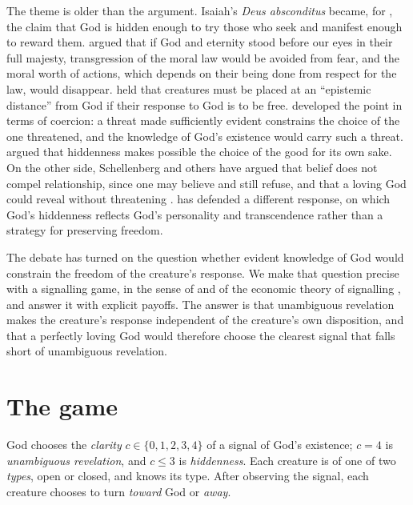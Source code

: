 \documentclass{situationist-preprint}
\begin{document}
The theme is older than the argument. Isaiah's \emph{Deus absconditus} became, for \citet{Pascal1670}, the claim that God is hidden enough to try those who seek and manifest enough to reward them. \citet[Part~I, Book~II, Ch.~2, \S~IX]{Kant1788} argued that if God and eternity stood before our eyes in their full majesty, transgression of the moral law would be avoided from fear, and the moral worth of actions, which depends on their being done from respect for the law, would disappear. \citet{Hick1966} held that creatures must be placed at an \enquote{epistemic distance} from God if their response to God is to be free. \citet{Murray1993} developed the point in terms of coercion: a threat made sufficiently evident constrains the choice of the one threatened, and the knowledge of God's existence would carry such a threat. \citet{Swinburne1998} argued that hiddenness makes possible the choice of the good for its own sake. On the other side, Schellenberg and others have argued that belief does not compel relationship, since one may believe and still refuse, and that a loving God could reveal without threatening \citep{Schellenberg2015}. \citet{Rea2018} has defended a different response, on which God's hiddenness reflects God's personality and transcendence rather than a strategy for preserving freedom.

The debate has turned on the question whether evident knowledge of God would constrain the freedom of the creature's response. We make that question precise with a signalling game, in the sense of \citet{Lewis1969} and of the economic theory of signalling \citep{Spence1973,CrawfordSobel1982,Skyrms2010}, and answer it with explicit payoffs. The answer is that unambiguous revelation makes the creature's response independent of the creature's own disposition, and that a perfectly loving God would therefore choose the clearest signal that falls short of unambiguous revelation.

\section{The game}

\begin{definition}\label{d:game}
God chooses the \emph{clarity} $c \in \{0, 1, 2, 3, 4\}$ of a signal of God's existence; $c = 4$ is \emph{unambiguous revelation}, and $c \leq 3$ is \emph{hiddenness}. Each creature is of one of two \emph{types}, open or closed, and knows its type. After observing the signal, each creature chooses to turn \emph{toward} God or \emph{away}.
\end{definition}
\end{document}
